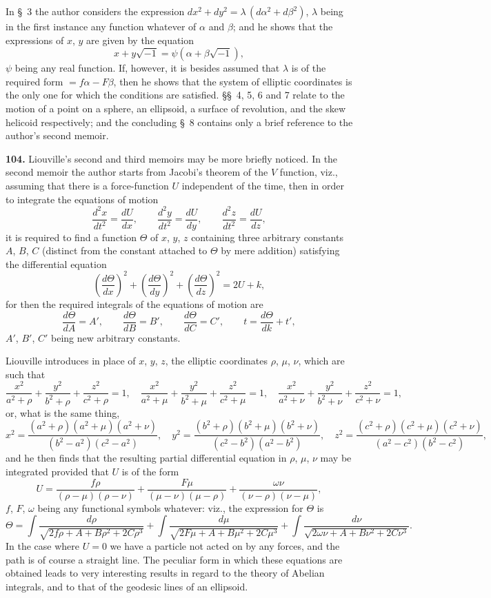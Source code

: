 \documentclass[11pt,a4paper]{book}
\begin{document}
In \S~3 the author considers the expression $dx^2 + dy^2 = \lambda\,(d\alpha^2 + d\beta^2)$, $\lambda$ being in the first instance any function whatever of $\alpha$ and $\beta$; and he shows that the expressions of $x$, $y$ are given by the equation
\[
x + y\sqrt{-1} = \psi(\alpha + \beta\sqrt{-1}),
\]
$\psi$ being any real function. If, however, it is besides assumed that $\lambda$ is of the required form $= f\alpha - F\beta$, then he shows that the system of elliptic coordinates is the only one for which the conditions are satisfied. \S\S~4, 5, 6 and 7 relate to the motion of a point on a sphere, an ellipsoid, a surface of revolution, and the skew helicoid respectively; and the concluding \S~8 contains only a brief reference to the author's second memoir.

\textbf{104.} Liouville's second and third memoirs may be more briefly noticed. In the second memoir the author starts from Jacobi's theorem of the $V$ function, viz., assuming that there is a force-function $U$ independent of the time, then in order to integrate the equations of motion
\[
\frac{d^2x}{dt^2} = \frac{dU}{dx}, \qquad \frac{d^2y}{dt^2} = \frac{dU}{dy}, \qquad \frac{d^2z}{dt^2} = \frac{dU}{dz},
\]
it is required to find a function $\Theta$ of $x$, $y$, $z$ containing three arbitrary constants $A$, $B$, $C$ (distinct from the constant attached to $\Theta$ by mere addition) satisfying the differential equation
\[
\left(\frac{d\Theta}{dx}\right)^2 + \left(\frac{d\Theta}{dy}\right)^2 + \left(\frac{d\Theta}{dz}\right)^2 = 2U + k,
\]
for then the required integrals of the equations of motion are
\[
\frac{d\Theta}{dA} = A', \qquad \frac{d\Theta}{dB} = B', \qquad \frac{d\Theta}{dC} = C', \qquad t = \frac{d\Theta}{dk} + t',
\]
$A'$, $B'$, $C'$ being new arbitrary constants.

Liouville introduces in place of $x$, $y$, $z$, the elliptic coordinates $\rho$, $\mu$, $\nu$, which are such that
\[
\frac{x^2}{a^2 + \rho} + \frac{y^2}{b^2 + \rho} + \frac{z^2}{c^2 + \rho} = 1, \quad
\frac{x^2}{a^2 + \mu} + \frac{y^2}{b^2 + \mu} + \frac{z^2}{c^2 + \mu} = 1, \quad
\frac{x^2}{a^2 + \nu} + \frac{y^2}{b^2 + \nu} + \frac{z^2}{c^2 + \nu} = 1,
\]
or, what is the same thing,
\[
x^2 = \frac{(a^2 + \rho)(a^2 + \mu)(a^2 + \nu)}{(b^2 - a^2)(c^2 - a^2)}, \quad
y^2 = \frac{(b^2 + \rho)(b^2 + \mu)(b^2 + \nu)}{(c^2 - b^2)(a^2 - b^2)}, \quad
z^2 = \frac{(c^2 + \rho)(c^2 + \mu)(c^2 + \nu)}{(a^2 - c^2)(b^2 - c^2)},
\]
and he then finds that the resulting partial differential equation in $\rho$, $\mu$, $\nu$ may be integrated provided that $U$ is of the form
\[
U = \frac{f\rho}{(\rho - \mu)(\rho - \nu)} + \frac{F\mu}{(\mu - \nu)(\mu - \rho)} + \frac{\omega\nu}{(\nu - \rho)(\nu - \mu)},
\]
$f$, $F$, $\omega$ being any functional symbols whatever: viz., the expression for $\Theta$ is
\[
\Theta = \int\!\frac{d\rho}{\sqrt{2f\rho + A + B\rho^2 + 2C\rho^3}}
+ \int\!\frac{d\mu}{\sqrt{2F\mu + A + B\mu^2 + 2C\mu^3}}
+ \int\!\frac{d\nu}{\sqrt{2\omega\nu + A + B\nu^2 + 2C\nu^3}}.
\]
In the case where $U = 0$ we have a particle not acted on by any forces, and the path is of course a straight line. The peculiar form in which these equations are obtained leads to very interesting results in regard to the theory of Abelian integrals, and to that of the geodesic lines of an ellipsoid.
\end{document}
